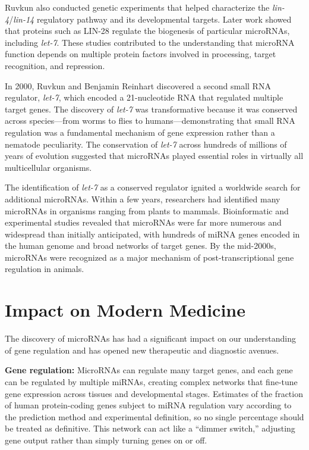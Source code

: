 Ruvkun also conducted genetic experiments that helped characterize the \textit{lin-4}/\textit{lin-14} regulatory pathway and its developmental targets. Later work showed that proteins such as LIN-28 regulate the biogenesis of particular microRNAs, including \textit{let-7}. These studies contributed to the understanding that microRNA function depends on multiple protein factors involved in processing, target recognition, and repression.

In 2000, Ruvkun and Benjamin Reinhart discovered a second small RNA regulator, \textit{let-7}, which encoded a 21-nucleotide RNA that regulated multiple target genes. The discovery of \textit{let-7} was transformative because it was conserved across species---from worms to flies to humans---demonstrating that small RNA regulation was a fundamental mechanism of gene expression rather than a nematode peculiarity. The conservation of \textit{let-7} across hundreds of millions of years of evolution suggested that microRNAs played essential roles in virtually all multicellular organisms.

The identification of \textit{let-7} as a conserved regulator ignited a worldwide search for additional microRNAs. Within a few years, researchers had identified many microRNAs in organisms ranging from plants to mammals. Bioinformatic and experimental studies revealed that microRNAs were far more numerous and widespread than initially anticipated, with hundreds of miRNA genes encoded in the human genome and broad networks of target genes. By the mid-2000s, microRNAs were recognized as a major mechanism of post-transcriptional gene regulation in animals.

\section{Impact on Modern Medicine}

The discovery of microRNAs has had a significant impact on our understanding of gene regulation and has opened new therapeutic and diagnostic avenues.

\textbf{Gene regulation:} MicroRNAs can regulate many target genes, and each gene can be regulated by multiple miRNAs, creating complex networks that fine-tune gene expression across tissues and developmental stages. Estimates of the fraction of human protein-coding genes subject to miRNA regulation vary according to the prediction method and experimental definition, so no single percentage should be treated as definitive. This network can act like a ``dimmer switch,'' adjusting gene output rather than simply turning genes on or off.

